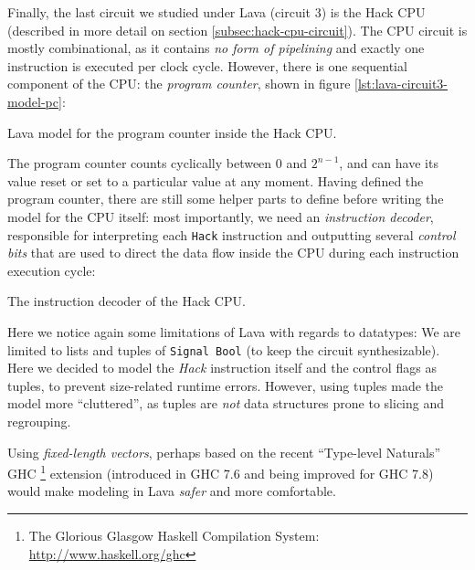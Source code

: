             Finally, the last circuit we studied under Lava (circuit 3) is the Hack CPU (described
            in more detail on section \ref{subsec:hack-cpu-circuit}). The CPU circuit is mostly
            combinational, as it contains \emph{no form of pipelining} and exactly one instruction
            is executed per clock cycle. However, there is one sequential component of the CPU: the
            \emph{program counter}, shown in figure \ref{lst:lava-circuit3-model-pc}:

            \begin{listing}[h!]
                \caption{Lava model for the program counter inside the Hack CPU.
                    \label{lst:lava-circuit3-model-pc}}
            \end{listing}

            The program counter counts cyclically between $ 0 $ and $ 2^{n-1} $, and can have its
            value reset or set to a particular value at any moment. Having defined the program
            counter, there are still some helper parts to define before writing the model for the
            CPU itself: most importantly, we need an \emph{instruction decoder}, responsible for
            interpreting each \texttt{Hack} instruction and outputting several \emph{control bits}
            that are used to direct the data flow inside the CPU during each instruction execution
            cycle:

            \begin{listing}[h!]
                \caption{The instruction decoder of the Hack CPU.
                    \label{lst:lava-circuit3-model-decoder}}
            \end{listing}

            Here we notice again some limitations of Lava with regards to datatypes: We are limited
            to lists and tuples of \texttt{Signal Bool} (to keep the circuit synthesizable). Here we
            decided to model the \emph{Hack} instruction itself and the control flags as tuples, to
            prevent size-related runtime errors. However, using tuples made the model more
            ``cluttered'', as tuples are \emph{not} data structures prone to slicing and regrouping.

            Using \emph{fixed-length vectors}, perhaps based on the recent ``Type-level Naturals''
            GHC \footnote{The Glorious Glasgow Haskell Compilation System:
                \url{http://www.haskell.org/ghc}} extension \cite{website:ghc-typenats} (introduced
            in GHC 7.6 and being improved for GHC 7.8) would make modeling in Lava \emph{safer} and
            more comfortable.


